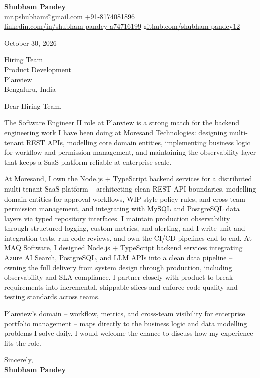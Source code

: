 \documentclass[a4paper,11pt]{article}
\begin{document}
\textbf{\Large Shubham Pandey}\\
\href{mailto:mr.pshubham@gmail.com}{mr.pshubham@gmail.com} \quad +91-8174081896\\
\href{https://www.linkedin.com/in/shubham-pandey-a74716199/}{linkedin.com/in/shubham-pandey-a74716199} \quad
\href{https://github.com/shubham-pandey12}{github.com/shubham-pandey12}

\vspace{1em}
October 30, 2026

\vspace{1em}
Hiring Team\\
Product Development\\
Planview\\
Bengaluru, India

\vspace{1em}
Dear Hiring Team,

The Software Engineer II role at Planview is a strong match for the backend engineering work I have been doing at Moresand Technologies: designing multi-tenant REST APIs, modelling core domain entities, implementing business logic for workflow and permission management, and maintaining the observability layer that keeps a SaaS platform reliable at enterprise scale.

At Moresand, I own the Node.js + TypeScript backend services for a distributed multi-tenant SaaS platform -- architecting clean REST API boundaries, modelling domain entities for approval workflows, WIP-style policy rules, and cross-team permission management, and integrating with MySQL and PostgreSQL data layers via typed repository interfaces. I maintain production observability through structured logging, custom metrics, and alerting, and I write unit and integration tests, run code reviews, and own the CI/CD pipelines end-to-end. At MAQ Software, I designed Node.js + TypeScript backend services integrating Azure AI Search, PostgreSQL, and LLM APIs into a clean data pipeline -- owning the full delivery from system design through production, including observability and SLA compliance. I partner closely with product to break requirements into incremental, shippable slices and enforce code quality and testing standards across teams.

Planview's domain -- workflow, metrics, and cross-team visibility for enterprise portfolio management -- maps directly to the business logic and data modelling problems I solve daily. I would welcome the chance to discuss how my experience fits the role.

\vspace{1em}
Sincerely,\\[0.5em]
\textbf{Shubham Pandey}
\end{document}
